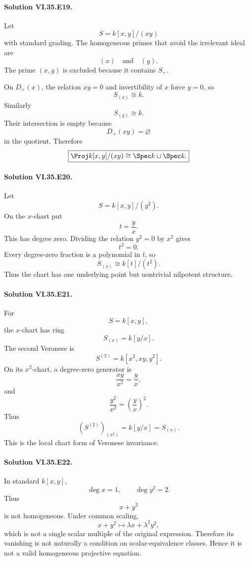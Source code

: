 \paragraph{Solution VI.35.E19.}
Let
\[
S=k[x,y]/(xy)
\]
with standard grading. The homogeneous primes that avoid the irrelevant ideal are
\[
(x)
\quad\text{and}\quad
(y).
\]
The prime \((x,y)\) is excluded because it contains \(S_+\).

On \(D_+(x)\), the relation \(xy=0\) and invertibility of \(x\) force \(y=0\), so
\[
S_{(x)}\cong k.
\]
Similarly
\[
S_{(y)}\cong k.
\]
Their intersection is empty because
\[
D_+(xy)=\varnothing
\]
in the quotient. Therefore
\[
\boxed{
\Proj k[x,y]/(xy)\cong\Spec k\sqcup\Spec k.
}
\]

\paragraph{Solution VI.35.E20.}
Let
\[
S=k[x,y]/(y^2).
\]
On the \(x\)-chart put
\[
t=\frac yx.
\]
This has degree zero. Dividing the relation \(y^2=0\) by \(x^2\) gives
\[
t^2=0.
\]
Every degree-zero fraction is a polynomial in \(t\), so
\[
\boxed{
S_{(x)}\cong k[t]/(t^2).
}
\]
Thus the chart has one underlying point but nontrivial nilpotent structure.

\paragraph{Solution VI.35.E21.}
For
\[
S=k[x,y],
\]
the \(x\)-chart has ring
\[
S_{(x)}=k[y/x].
\]
The second Veronese is
\[
S^{(2)}=k[x^2,xy,y^2].
\]
On its \(x^2\)-chart, a degree-zero generator is
\[
\frac{xy}{x^2}=\frac yx,
\]
and
\[
\frac{y^2}{x^2}=\left(\frac yx\right)^2.
\]
Thus
\[
\boxed{
(S^{(2)})_{(x^2)}
=
k[y/x]
=
S_{(x)}.
}
\]
This is the local chart form of Veronese invariance.

\paragraph{Solution VI.35.E22.}
In standard \(k[x,y]\),
\[
\deg x=1,
\qquad
\deg y^2=2.
\]
Thus
\[
x+y^2
\]
is not homogeneous. Under common scaling,
\[
x+y^2
\longmapsto
\lambda x+\lambda^2y^2,
\]
which is not a single scalar multiple of the original expression. Therefore its vanishing is not naturally a
condition on scalar-equivalence classes. Hence it is not a valid homogeneous projective equation.

